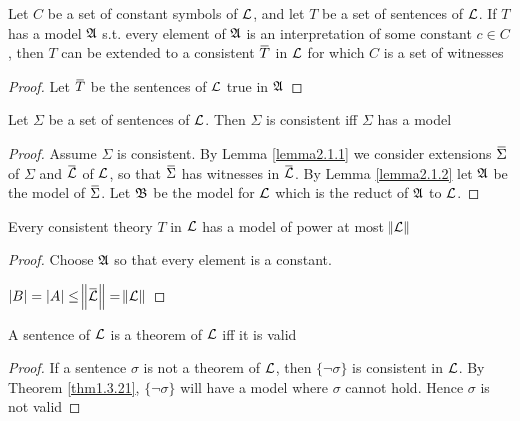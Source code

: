 \documentclass[11pt]{article}
\begin{document}
\begin{lemma}[]
\label{lemma2.1.3}
Let \(C\) be a set of constant symbols of \(\mathcal{L}\), and let \(T\) be a
set of sentences of \(\mathcal{L}\). If \(T\) has a model \(\mathfrak{A}\) s.t. every
element of \(\mathfrak{A}\) is an interpretation of some constant \(c\in C\), then
\(T\) can be extended to a consistent \(\bbar{T}\) in \(\mathcal{L}\) for which
\(C\) is a set of witnesses
\end{lemma}

\begin{proof}
Let \(\bbar{T}\) be the sentences of \(\mathcal{L}\) true in \(\mathfrak{A}\)
\end{proof}

\begin{theorem}
   \label{thm1.3.21} 
Let \(\Sigma\) be a set of sentences of \(\mathcal{L}\). Then \(\Sigma\) is consistent iff \(\Sigma\) has a model
\end{theorem}

\begin{proof}
Assume \(\Sigma\) is consistent.  By Lemma \ref{lemma2.1.1} we consider extensions
\(\bbar{\Sigma}\) of \(\Sigma\) and \(\bbar{\call}\) of \(\mathcal{L}\), so that \(\bbar{\Sigma}\) has
witnesses in \(\bbar{\call}\). By Lemma \ref{lemma2.1.2} let \(\mathfrak{A}\) be the
model of \(\bbar{\Sigma}\). Let \(\mathfrak{B}\) be the model for \(\mathcal{L}\) which is the
reduct of \(\mathfrak{A}\) to \(\mathcal{L}\).
\end{proof}

\begin{corollary}


Every consistent theory \(T\) in \(\mathcal{L}\) has a model of power at most \(\norm{\mathcal{L}}\)
\end{corollary}

\begin{proof}
Choose \(\mathfrak{A}\) so that every element is a constant.

\(\abs{B}=\abs{A}\le\norm{\bbar{\call}}=\norm{\call}\)
\end{proof}

\begin{theorem}
\label{thm1.3.20}
A sentence of \(\mathcal{L}\) is a theorem of \(\mathcal{L}\) iff it is valid
\end{theorem}

\begin{proof}
If a sentence \(\sigma\) is not a theorem of \(\mathcal{L}\), then \(\{\neg\sigma\}\) is
consistent in \(\mathcal{L}\). By Theorem \ref{thm1.3.21}, \(\{\neg\sigma\}\) will
have a model where \(\sigma\) cannot hold. Hence \(\sigma\) is not valid
\end{proof}
\end{document}
